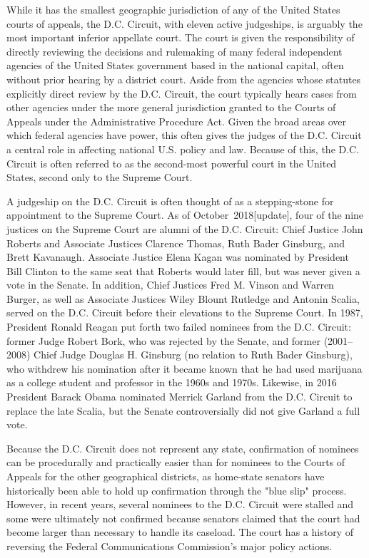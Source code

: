 While it has the smallest geographic jurisdiction of any of the United
States courts of appeals, the D.C. Circuit, with eleven active
judgeships, is arguably the most important inferior appellate court. The
court is given the responsibility of directly reviewing the decisions
and rulemaking of many federal independent agencies of the United States
government based in the national capital, often without prior hearing by
a district court. Aside from the agencies whose statutes explicitly
direct review by the D.C. Circuit, the court typically hears cases from
other agencies under the more general jurisdiction granted to the Courts
of Appeals under the Administrative Procedure Act. Given the broad areas
over which federal agencies have power, this often gives the judges of
the D.C. Circuit a central role in affecting national U.S. policy and
law. Because of this, the D.C. Circuit is often referred to as the
second-most powerful court in the United States, second only to the
Supreme Court.

A judgeship on the D.C. Circuit is often thought of as a stepping-stone
for appointment to the Supreme Court. As of October~2018{[}update{]},
four of the nine justices on the Supreme Court are alumni of the D.C.
Circuit: Chief Justice John Roberts and Associate Justices Clarence
Thomas, Ruth Bader Ginsburg, and Brett Kavanaugh. Associate Justice
Elena Kagan was nominated by President Bill Clinton to the same seat
that Roberts would later fill, but was never given a vote in the Senate.
In addition, Chief Justices Fred M. Vinson and Warren Burger, as well as
Associate Justices Wiley Blount Rutledge and Antonin Scalia, served on
the D.C. Circuit before their elevations to the Supreme Court. In 1987,
President Ronald Reagan put forth two failed nominees from the D.C.
Circuit: former Judge Robert Bork, who was rejected by the Senate, and
former (2001--2008) Chief Judge Douglas H. Ginsburg (no relation to Ruth
Bader Ginsburg), who withdrew his nomination after it became known that
he had used marijuana as a college student and professor in the 1960s
and 1970s. Likewise, in 2016 President Barack Obama nominated Merrick
Garland from the D.C. Circuit to replace the late Scalia, but the Senate
controversially did not give Garland a full vote.

Because the D.C. Circuit does not represent any state, confirmation of
nominees can be procedurally and practically easier than for nominees to
the Courts of Appeals for the other geographical districts, as
home-state senators have historically been able to hold up confirmation
through the "blue slip" process. However, in recent years, several
nominees to the D.C. Circuit were stalled and some were ultimately not
confirmed because senators claimed that the court had become larger than
necessary to handle its caseload. The court has a history of reversing
the Federal Communications Commission's major policy actions.

